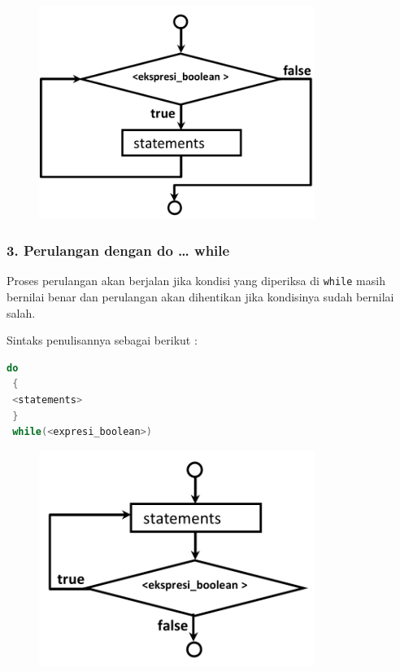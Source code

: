 \begin{figure}[htbp]
\centering
\includegraphics[width=0.8\textwidth]{images/capture2-9.png}
\caption{}
\end{figure}

\subsubsection{3. Perulangan dengan do \ldots{}
while}\label{perulangan-dengan-do-while}

Proses perulangan akan berjalan jika kondisi yang diperiksa di
\texttt{while} masih bernilai benar dan perulangan akan dihentikan jika
kondisinya sudah bernilai salah.

Sintaks penulisannya sebagai berikut :

\begin{lstlisting}[language=c++]
 do
 {
 <statements>
 }
 while(<expresi_boolean>)
\end{lstlisting}

\begin{figure}[htbp]
\centering
\includegraphics[width=0.8\textwidth]{images/capture2-10.png}
\caption{}
\end{figure}

